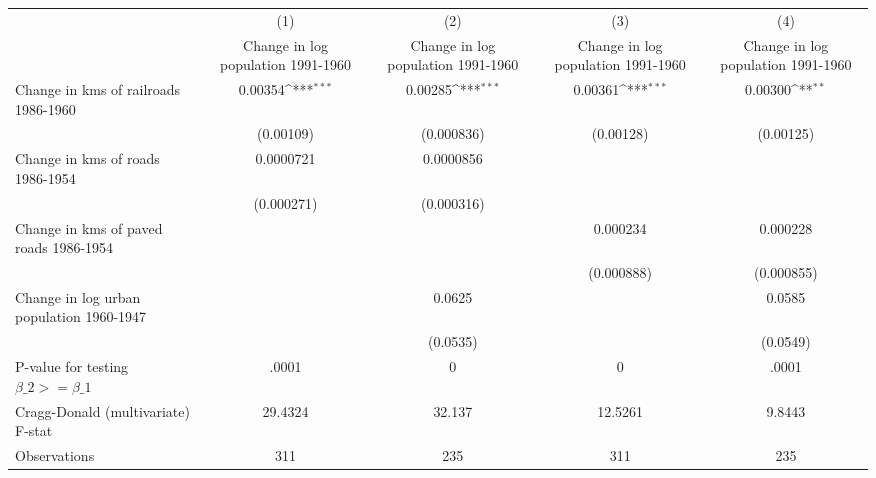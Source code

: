 {
\def\sym#1{\ifmmode^{#1}\else\(^{#1}\)\fi}
\begin{tabular}{l*{4}{c}}
\hline\hline
                &\multicolumn{1}{c}{(1)}&\multicolumn{1}{c}{(2)}&\multicolumn{1}{c}{(3)}&\multicolumn{1}{c}{(4)}\\
                &\multicolumn{1}{c}{Change in log population 1991-1960}&\multicolumn{1}{c}{Change in log population 1991-1960}&\multicolumn{1}{c}{Change in log population 1991-1960}&\multicolumn{1}{c}{Change in log population 1991-1960}\\
\hline
Change in kms of railroads 1986-1960&  0.00354\sym{***}&  0.00285\sym{***}&  0.00361\sym{***}&  0.00300\sym{**} \\
                &(0.00109)         &(0.000836)         &(0.00128)         &(0.00125)         \\
[1em]
Change in kms of roads 1986-1954&0.0000721         &0.0000856         &                  &                  \\
                &(0.000271)         &(0.000316)         &                  &                  \\
[1em]
Change in kms of paved roads 1986-1954&                  &                  & 0.000234         & 0.000228         \\
                &                  &                  &(0.000888)         &(0.000855)         \\
[1em]
Change in log urban population 1960-1947&                  &   0.0625         &                  &   0.0585         \\
                &                  & (0.0535)         &                  & (0.0549)         \\
\hline
P-value for testing $\beta\_{2} >= \beta\_{1}$&    .0001         &        0         &        0         &    .0001         \\
Cragg-Donald (multivariate) F-stat&  29.4324         &   32.137         &  12.5261         &   9.8443         \\
Observations    &      311         &      235         &      311         &      235         \\
\hline\hline
\end{tabular}
}
